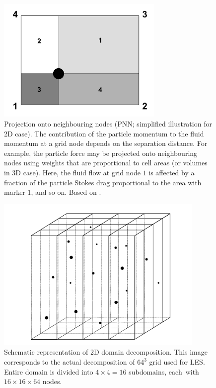 
\begin{figure}
\centering
\includegraphics[width=8cm]{figures/1-03_pnn.pdf}
\caption{
Projection onto neighbouring nodes (PNN; simplified illustration for 2D case).
The contribution of the particle momentum to the fluid momentum at a grid node depends on the separation distance.
For example, the particle force may be projected onto neighbouring nodes using weights that are proportional to cell areas (or volumes in 3D case).
Here, the fluid flow at grid node $1$ is affected by a fraction of the particle Stokes drag proportional to the area with marker $1$, and so on.
Based on \textcite[Fig. 1 therein]{Garg2007}.}
\label{fig:pnn}
\end{figure}


\begin{figure}
\centering
\includegraphics[width=10cm]{figures/1-04_2dd.pdf}
\caption{
Schematic representation of 2D domain decomposition.
This image corresponds to the actual decomposition of $64^{3}$ grid used for LES.
Entire domain is divided into $4 \times 4 = 16$ subdomains, each~with~$16 \times 16 \times 64$ nodes.
}
\label{fig:2dd}
\end{figure}



